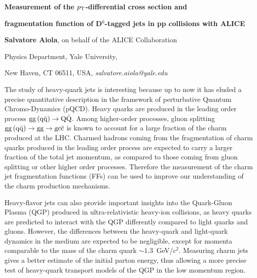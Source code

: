 \documentclass[12pt]{article}
\begin{document}
\centerline{\bf 
Measurement of the $p_{\rm T}$-differential cross section and
}

\centerline{\bf 
fragmentation function of D$^0$-tagged jets in pp collisions with ALICE
}

\vspace{12pt}

\centerline{ {\bf Salvatore Aiola}, on behalf of the ALICE Collaboration }

\vspace{12pt}

\centerline{Physics Department, Yale University,
}\centerline{New Haven, CT 06511, USA, {\it salvatore.aiola@yale.edu}}

\vspace{12pt}


\vspace{12pt} \vspace{12pt}

The study of heavy-quark jets is interesting because up to now
it has eluded a precise quantitative description in the framework of perturbative
Quantum Chromo-Dynamics (pQCD).
Heavy quarks are produced in the leading order process ${\rm gg\, (q\bar{q})} \rightarrow {\rm Q\bar{Q}}$.
Among higher-order processes, gluon splitting ${\rm gg\, (q\bar{q})} \rightarrow {\rm gg} \rightarrow \rm gc\bar{c}$
is known to account for a large fraction of the charm produced at the LHC.
Charmed hadrons coming from the fragmentation of charm quarks
produced in the leading order process
are expected to carry a larger fraction of the total jet momentum,
as compared to those coming from gluon splitting or other higher order processes. 
Therefore the measurement of the charm jet fragmentation functions (FFs) 
can be used to improve our understanding of the charm production mechanisms.

Heavy-flavor jets can also provide important insights into the Quark-Gluon Plasma (QGP)
produced in ultra-relativistic heavy-ion collisions, as heavy quarks are predicted
to interact with the QGP differently compared to light quarks and gluons. 
However, the differences between the heavy-quark and light-quark dynamics in the medium
are expected to be negligible, except for momenta comparable to the mass of the charm quark $\sim 1.3$~GeV/$c^2$.
Measuring charm jets gives a better estimate of the initial parton energy,
thus allowing a more precise test of heavy-quark transport models of the QGP in the low momentum region.
\end{document}
